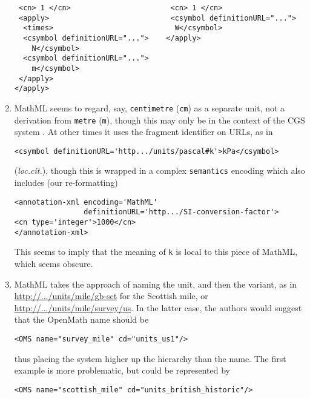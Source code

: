 \documentclass[11pt]{openmathTN}
\begin{document}
\begin{enumerate}
\begin{table}[ht]
\begin{verbatim}
 <cn> 1 </cn>                       <cn> 1 </cn>
 <apply>                            <csymbol definitionURL="...">
  <times>                            W</csymbol>
  <csymbol definitionURL="...">    </apply>
    N</csymbol>
  <csymbol definitionURL="...">
    m</csymbol>
 </apply>
</apply>
\end{verbatim}
\end{table}
\item\label{MathMLprefix}MathML seems to regard, say, {\tt centimetre}
({\tt cm}) as a separate unit, not a derivation from {\tt metre} ({\tt m}),
though this may only be in the context of the CGS system \cite[section
6.5.1]{WorldWideWebConsortium2003}. At other times it uses the fragment
identifier on URLs, as in
\begin{verbatim}
<csymbol definitionURL='http.../units/pascal#k'>kPa</csymbol>
\end{verbatim}
({\it loc.cit.\/}), though this is wrapped in a complex {\tt semantics}
encoding which also includes (our re-formatting)
\begin{verbatim}
<annotation-xml encoding='MathML'
                definitionURL='http.../SI-conversion-factor'>
<cn type='integer'>1000</cn>
</annotation-xml>
\end{verbatim}
This seems to imply that the meaning of {\tt k} is local to this piece of
MathML, which seems obscure.
\item\label{variants}MathML takes the approach of naming the unit, and then
the variant, as in \cite[section 5.3.4]{WorldWideWebConsortium2003}
\url{http://.../units/mile/gb-sct} for the Scottish mile, or
\url{http://.../units/mile/survey/us}. In the latter case, the authors would
suggest that the OpenMath name should be
\begin{verbatim}
<OMS name="survey_mile" cd="units_us1"/>
\end{verbatim}
thus placing the system higher up the hierarchy than the name. The first
example is more problematic, but could be represented by
\begin{verbatim}
<OMS name="scottish_mile" cd="units_british_historic"/>
\end{verbatim}
\end{enumerate}
\end{document}
